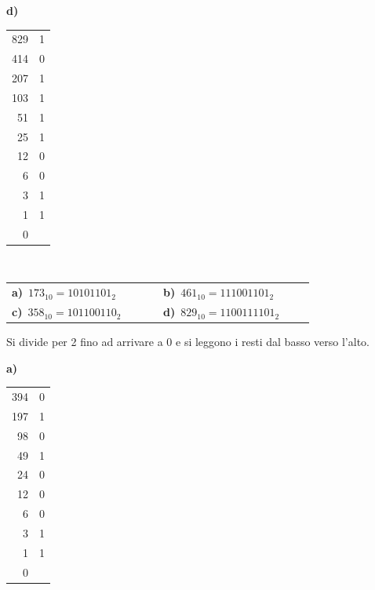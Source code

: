 \begin{esercizio}[8]
\begin{solution}
{\begin{minipage}[t]{0.24\linewidth}
  \end{minipage}\hfill
  \begin{minipage}[t]{0.24\linewidth}
  \textbf{d)}\\[2pt]
  {\small\renewcommand{\arraystretch}{1.0}\begin{tabular}{r|l}
    829 & 1\\
    414 & 0\\
    207 & 1\\
    103 & 1\\
    51 & 1\\
    25 & 1\\
    12 & 0\\
    6 & 0\\
    3 & 1\\
    1 & 1\\
    0 & \\
  \end{tabular}}
  \end{minipage}\\[6pt]
\par\smallskip\noindent\hspace*{1em}\begin{tabular}{@{}p{0.42\linewidth}p{0.42\linewidth}@{}}
  \textbf{a)}~$173_{10} = 10101101_2$ & \textbf{b)}~$461_{10} = 111001101_2$\\[4pt]
  \textbf{c)}~$358_{10} = 101100110_2$ & \textbf{d)}~$829_{10} = 1100111101_2$
\end{tabular}\par\smallskip
  Si divide per 2 fino ad arrivare a 0 e si leggono i resti dal basso verso l'alto.}{%
\noindent
  \begin{minipage}[t]{0.24\linewidth}
  \textbf{a)}\\[2pt]
  {\small\renewcommand{\arraystretch}{1.0}\begin{tabular}{r|l}
    394 & 0\\
    197 & 1\\
    98 & 0\\
    49 & 1\\
    24 & 0\\
    12 & 0\\
    6 & 0\\
    3 & 1\\
    1 & 1\\
    0 & \\
  \end{tabular}}
  \end{minipage}\hfill
  \begin{minipage}[t]{0.24\linewidth}

\end{minipage}}
\end{solution}
\end{esercizio}
